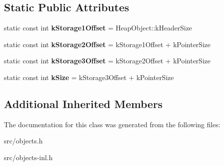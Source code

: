 \subsection*{Static Public Attributes}
\begin{DoxyCompactItemize}
\item 
\hypertarget{classv8_1_1internal_1_1_type_feedback_info_a60514fdc6640adb4ef1a318f1e77b144}{}static const int {\bfseries k\+Storage1\+Offset} = Heap\+Object\+::k\+Header\+Size\label{classv8_1_1internal_1_1_type_feedback_info_a60514fdc6640adb4ef1a318f1e77b144}

\item 
\hypertarget{classv8_1_1internal_1_1_type_feedback_info_a018effc7aa365f49af3b1eb1838ac635}{}static const int {\bfseries k\+Storage2\+Offset} = k\+Storage1\+Offset + k\+Pointer\+Size\label{classv8_1_1internal_1_1_type_feedback_info_a018effc7aa365f49af3b1eb1838ac635}

\item 
\hypertarget{classv8_1_1internal_1_1_type_feedback_info_a05da822d50314943ada1463d10986567}{}static const int {\bfseries k\+Storage3\+Offset} = k\+Storage2\+Offset + k\+Pointer\+Size\label{classv8_1_1internal_1_1_type_feedback_info_a05da822d50314943ada1463d10986567}

\item 
\hypertarget{classv8_1_1internal_1_1_type_feedback_info_ace41df54997c2e68abc74b33d39fb4d5}{}static const int {\bfseries k\+Size} = k\+Storage3\+Offset + k\+Pointer\+Size\label{classv8_1_1internal_1_1_type_feedback_info_ace41df54997c2e68abc74b33d39fb4d5}

\end{DoxyCompactItemize}
\subsection*{Additional Inherited Members}


The documentation for this class was generated from the following files\+:\begin{DoxyCompactItemize}
\item 
src/objects.\+h\item 
src/objects-\/inl.\+h\end{DoxyCompactItemize}

